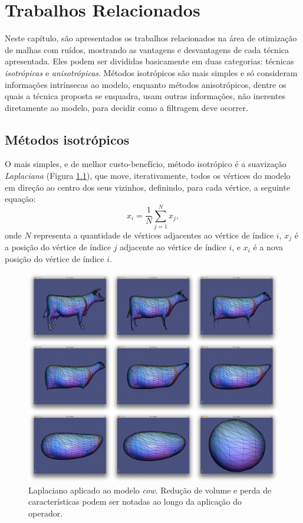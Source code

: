 \chapter{Trabalhos Relacionados}
\label{cap:trabalhos-relacionados}

Neste capítulo, são apresentados os trabalhos relacionados na área de otimização de malhas com ruídos, mostrando as vantagens e desvantagens de cada técnica apresentada. Eles podem ser divididas basicamente em duas categorias: técnicas \textit{isotrópicas} e \textit{anisotrópicas}. Métodos isotrópicos são mais simples e só consideram informações intrínsecas ao modelo, enquanto métodos anisotrópicos, dentre os quais a técnica proposta se enquadra, usam outras informações, não inerentes diretamente ao modelo, para decidir como a filtragem deve ocorrer.

\section{Métodos isotrópicos}
O mais simples, e de melhor custo-benefício, método isotrópico é a suavização \textit{Laplaciana} (Figura \ref{fig:laplacian}), que move, iterativamente, todos os vértices do modelo em direção ao centro dos seus vizinhos, definindo, para cada vértice, a seguinte equação:
\begin{equation} \label{eq:laplacian}
    x_i = \frac{1}{N} \sum^{N}_{j=1} x_j,
\end{equation}
onde $N$ representa a quantidade de vértices adjacentes ao vértice de índice $i$, $x_j$ é a posição do vértice de índice $j$ adjacente ao vértice de índice $i$, e $x_i$ é a nova posição do vértice de índice $i$.

\begin{figure}[!h]
\captionsetup{width=\linewidth}
\centering
\includegraphics[scale=0.12]{figuras/laplacian.jpg}
\caption{Laplaciano aplicado ao modelo \textit{cow}. Redução de volume e perda de características podem ser notadas ao longo da aplicação do operador.}
\label{fig:laplacian}
\end{figure}

